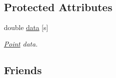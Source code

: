 \subsection*{Protected Attributes}
\begin{DoxyCompactItemize}
\item 
double \hyperlink{classzbe_1_1_vector_a1adaf8d4244fe2c1d762d6c58f4b01eb}{data} \mbox{[}s\mbox{]}
\begin{DoxyCompactList}\small\item\em \hyperlink{classzbe_1_1_point}{Point} data. \end{DoxyCompactList}\end{DoxyCompactItemize}
\subsection*{Friends}
